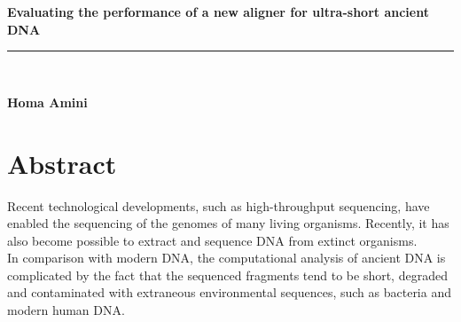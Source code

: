 \documentclass[11pt,a4paper]{report}
\makeatletter
\newcommand{\at}{\makeatletter @\makeatother}
\newcommand{\HRule}{\rule{\linewidth}{0.5mm}}
\makeatother
\begin{document}

\begin{titlepage}
\begin{center}
{ \huge \bfseries \textbf{ Evaluating the performance of a new aligner for ultra-short ancient DNA }}\\[0.4cm]
\HRule \\[0.5cm]
\begin{minipage}{0.9\textwidth}
\begin{flushleft} \large
{\textbf{Homa Amini}}\\
\end{flushleft}
\end{minipage}
\vfill
\end{center}
\end{titlepage}

\newpage\null\thispagestyle{empty}\newpage
\newpage
\newpage

\section*{Abstract}

Recent technological developments, such as high-throughput sequencing,
have enabled the sequencing of the genomes of many living organisms.  
Recently, it has also become possible to extract and sequence DNA from extinct organisms.\\ 
In comparison with modern DNA, the computational analysis of ancient DNA is complicated
by the fact that the sequenced fragments tend to be short, degraded and contaminated with
extraneous environmental sequences, such as bacteria and modern human DNA.
\end{document}
